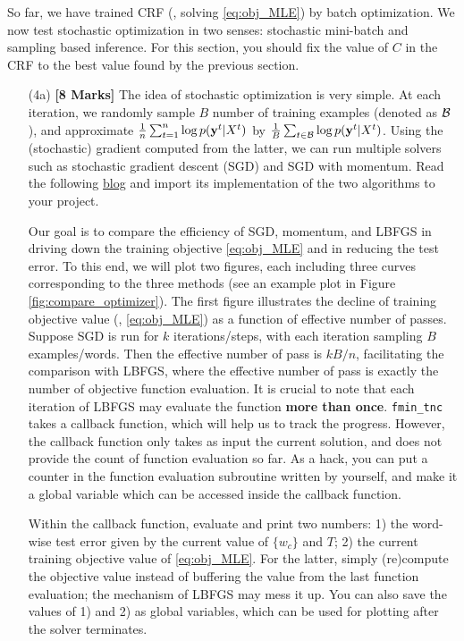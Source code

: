 \documentclass[11pt]{report}
\begin{document}
	
	So far, we have trained CRF (\ie, solving \eqref{eq:obj_MLE}) by batch optimization.
	We now test stochastic optimization in two senses:
	stochastic mini-batch and sampling based inference.
	For this section, you should fix the value of $C$ in the CRF to the best value found by the previous section.
	\begin{itemize}
		\item[(4a)] {\bf [8 Marks]}
		The idea of stochastic optimization is very simple. 
		At each iteration, we randomly sample $B$ number of training examples (denoted as $\mathcal{B}$), 
		and approximate $\frac{1}{n}\sum_{t=1}^n \log p(\mathbf{\boldsymbol{y}}^t | X^t)$
		by $\frac{1}{B}\sum_{t\in \mathcal{B}} \log p(\mathbf{\boldsymbol{y}}^t | X^t)$.
		Using the (stochastic) gradient computed from the latter, 
		we can run multiple solvers such as stochastic gradient descent (SGD)
		and SGD with momentum.
		Read the following \href{https://machinelearningmastery.com/gradient-descent-with-momentum-from-scratch/}{blog} and import its implementation of the two algorithms to your project.
		
		
		Our goal is to compare the efficiency of SGD, momentum, and LBFGS in driving down the training objective \eqref{eq:obj_MLE} and in reducing the test error.
		To this end, we will plot two figures, each including three curves corresponding to the  three methods (see an example plot in Figure \ref{fig:compare_optimizer}).
		The first figure illustrates the decline of training objective value (\ie, \eqref{eq:obj_MLE}) as a function of effective number of passes.
		Suppose SGD is run for $k$ iterations/steps, with each iteration sampling $B$ examples/words.
		Then the effective number of pass is $kB/n$,
		facilitating the comparison with LBFGS,
		where the effective number of pass is exactly the number of objective function evaluation.
		It is crucial to note that each iteration of LBFGS may evaluate the function \textbf{more than once}.
		\verb#fmin_tnc# takes a callback function, which will help us to track the progress.
		However, the callback function only takes as input the current solution,
		and does not provide the count of function evaluation so far.
		As a hack, you can put a counter in the function evaluation subroutine written by yourself,
		and make it a global variable which can be accessed inside the callback function.
		
		Within the callback function, evaluate and print two numbers: 
		1) the word-wise test error given by the current value of $\{w_c\}$ and $T$;
		2) the current training objective value of \eqref{eq:obj_MLE}.
		For the latter, simply (re)compute the objective value instead of buffering the value from the last function evaluation; the mechanism of LBFGS may mess it up.
		You can also save the values of 1) and 2) as global variables,
		which can be used for plotting after the solver terminates.
		

\end{itemize}
\end{document}
